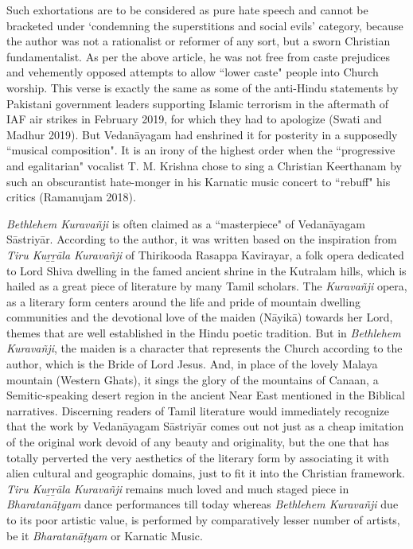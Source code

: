 Such exhortations are to be considered as pure hate speech and cannot 
be bracketed under `condemning the superstitions and social evils' 
category, because the author was not a rationalist or reformer of any sort, but a sworn Christian fundamentalist. As per the above article, he was not free from caste prejudices and vehemently opposed attempts to allow ``lower caste" people into Church worship. This verse is exactly the same as some of the anti-Hindu statements by Pakistani government leaders supporting Islamic terrorism in the aftermath of IAF air strikes in February 2019, for which they had to apologize (Swati and Madhur 2019). But Vedanāyagam had enshrined it for posterity in a supposedly ``musical composition". It is an irony of the highest order when the ``progressive and egalitarian" vocalist T. M. Krishna chose to sing a Christian Keerthanam by such an obscurantist hate-monger in his Karnatic music concert to ``rebuff" his critics (Ramanujam 2018).

\textit{Bethlehem Kuravañji} is often claimed as a ``masterpiece" of Vedanāya\-gam Sāstriyār. According to the author, it was written based on the inspiration from \textit{Tiru Kuṟṟāla Kuravañji} of Thirikooda Rasappa Kavirayar, a folk opera dedicated to Lord Shiva dwelling in the famed ancient shrine in the Kutralam hills, which is hailed as a great piece of literature by many Tamil scholars. The \textit{Kuravañji} opera, as a literary form centers around the life and pride of mountain dwelling communities and the devotional love of the maiden (Nāyikā) towards her Lord, themes that are well established in the Hindu poetic tradition. But in \textit{Bethlehem Kuravañji}, the maiden is a character that represents the Church according to the author, which is the Bride of Lord Jesus. And, in place of the lovely Malaya mountain (Western Ghats), it sings the glory of the mountains of Canaan, a Semitic-speaking desert region in the ancient Near East mentioned in the Biblical narratives. Discerning readers of Tamil literature would immediately recognize that the work by Vedanāyagam Sāstriyār comes out not just as a cheap imitation of the original work devoid of any beauty and originality, but the one that has totally perverted the very aesthetics of the literary form by associating it with alien cultural and geographic domains, just to fit it into the Christian framework. \textit{Tiru Kuṟṟāla Kuravañji }remains much loved and much staged piece in \textit{Bharatanāṭ­yam} dance performances till today whereas \textit{Bethlehem Kuravañji} due to its poor artistic value, is performed by comparatively lesser number of artists, be it \textit{Bharatanāṭ­yam} or Karnatic Music.

